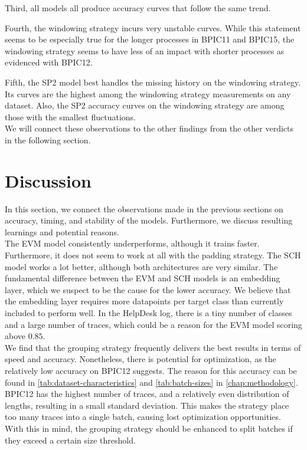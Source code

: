 Third, all models all produce accuracy curves that follow the same trend.

Fourth, the windowing strategy incurs very unstable curves.
While this statement seems to be especially true for the longer processes in BPIC11 and BPIC15, the windowing strategy seems to have less of an impact with shorter processes as evidenced with BPIC12.

Fifth, the SP2 model best handles the missing history on the windowing strategy.
Its curves are the highest among the windowing strategy measurements on any dataset.
Also, the SP2 accuracy curves on the windowing strategy are among those with the smallest fluctuations.\\

We will connect these observations to the other findings from the other verdicts in the following section.

\section{Discussion}\label{sec:eval:discussion}
In this section, we connect the observations made in the previous sections on accuracy, timing, and stability of the models.
Furthermore, we discuss resulting learnings and potential reasons.\\

The EVM model consistently underperforms, although it trains faster.
Furthermore, it does not seem to work at all with the padding strategy.
The SCH model works a lot better, although both architectures are very similar.
The fundamental difference between the EVM and SCH models is an embedding layer, which we suspect to be the cause for the lower accuracy.
We believe that the embedding layer requires more datapoints per target class than currently included to perform well.
In the HelpDesk log, there is a tiny number of classes and a large number of traces, which could be a reason for the EVM model scoring above $0.85$.\\

We find that the grouping strategy frequently delivers the best results in terms of speed and accuracy.
Nonetheless, there is potential for optimization, as the relatively low accuracy on BPIC12 suggests.
The reason for this accuracy can be found in \autoref{tab:dataset-characteristics} and \autoref{tab:batch-sizes} in \autoref{chap:methodology}.
BPIC12 has the highest number of traces, and a relatively even distribution of lengths, resulting in a small standard deviation.
This makes the strategy place too many traces into a single batch, causing lost optimization opportunities.
With this in mind, the grouping strategy should be enhanced to split batches if they exceed a certain size threshold.\\

